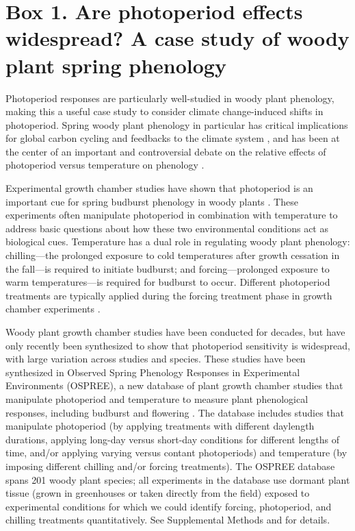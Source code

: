 \documentclass{article}
\begin{document}
\section*{Box 1. Are photoperiod effects widespread? A case study of woody plant spring phenology}
\par Photoperiod responses are particularly well-studied in woody plant phenology, making this a useful case study to consider climate change-induced shifts in photoperiod. Spring woody plant phenology in particular has critical implications for global carbon cycling and feedbacks to the climate system \citep{richardson2013}, and has been at the center of an important and controversial debate on the relative effects of photoperiod versus temperature on phenology \citep[e.g.,][]{fu2019,chuine2010,koerner2010a,koerner2010b}. 

\par Experimental growth chamber studies have shown that photoperiod is an important cue for spring budburst phenology in woody plants \citep[e.g.,][]{flynn2018,Basler:2014aa,Heide:1993a}. These experiments often manipulate photoperiod in combination with temperature to address basic questions about how these two environmental conditions act as biological cues. Temperature has a dual role in regulating woody plant phenology: chilling---the prolonged exposure to cold temperatures after growth cessation in the fall---is required to initiate budburst; and forcing---prolonged exposure to warm temperatures---is required for budburst to occur. Different photoperiod treatments are typically applied during the forcing treatment phase in growth chamber experiments \citep[e.g.,][]{Laube:2014a,Spann:2004aa,Falusi:1990aa,HEIDE:1977aa,Campbell:1975aa}. 

\par Woody plant growth chamber studies have been conducted for decades, but have only recently been synthesized to show that photoperiod sensitivity is widespread, with large variation across studies and species. These studies have been synthesized in Observed Spring Phenology Responses in Experimental Environments (OSPREE), a new database of plant growth chamber studies that manipulate photoperiod and temperature to measure plant phenological responses, including budburst and flowering \citep{wolkovich2019}. The database includes studies that manipulate photoperiod (by applying treatments with different daylength durations, applying long-day versus short-day conditions for different lengths of time, and/or applying varying versus contant photoperiods) and temperature (by imposing different chilling and/or forcing treatments). The OSPREE database spans 201 woody plant species; all experiments in the database use dormant plant tissue (grown in greenhouses or taken directly from the field) exposed to experimental conditions \citep{wolkovich2019} for which we could identify forcing, photoperiod, and chilling treatments quantitatively. See Supplemental Methods and \citet{wolkovich2019} for details. 
\end{document}
